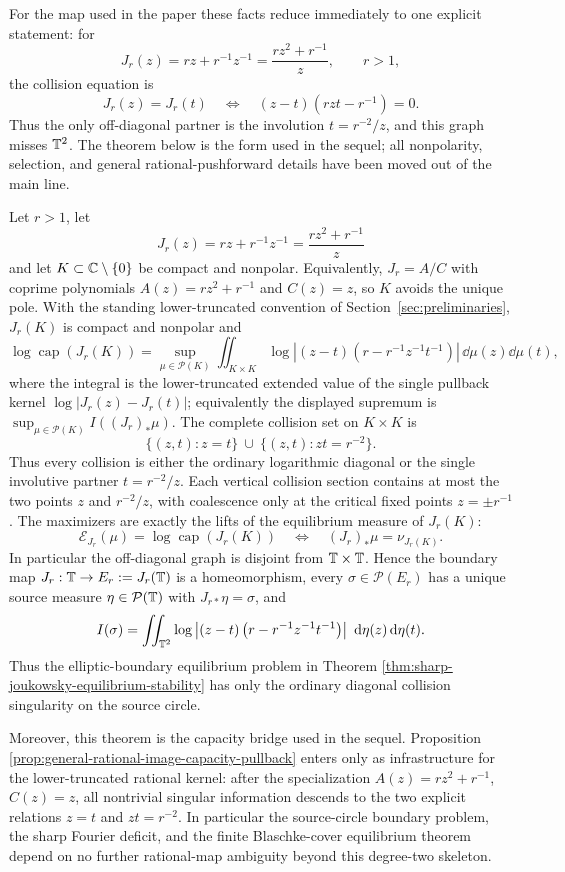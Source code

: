 For the map used in the paper these facts reduce immediately to one
explicit statement: for
\[
J_r(z)=rz+r^{-1}z^{-1}=\frac{rz^2+r^{-1}}{z},\qquad r>1,
\]
the collision equation is
\[
J_r(z)=J_r(t)\quad\Longleftrightarrow\quad (z-t)(rzt-r^{-1})=0.
\]
Thus the only off-diagonal partner is the involution
\(t=r^{-2}/z\), and this graph misses \(\mathbb{T}^2\).  The theorem below is
the form used in the sequel; all nonpolarity, selection, and general
rational-pushforward details have been moved out of the main line.
\begin{theorem}\label{thm:degree-two-joukowsky-capacity-collision-relation}
Let \(r>1\), let
\[
J_r(z)=rz+r^{-1}z^{-1}=\frac{rz^2+r^{-1}}{z}
\]
  and let \(K\subset\mathbb{C}\setminus\{0\}\) be compact and nonpolar.  Equivalently, \(J_r=A/C\) with coprime polynomials \(A(z)=rz^2+r^{-1}\) and \(C(z)=z\), so \(K\) avoids the unique pole.  With the standing lower-truncated convention of Section~\ref{sec:preliminaries}, \(J_r(K)\) is compact and nonpolar and
\[
\log\operatorname{cap}(J_r(K))
=\sup_{\mu\in\mathcal P(K)}\iint_{K\times K}\log\left|(z-t)\left(r-r^{-1}z^{-1}t^{-1}\right)\right|\,
\dd\mu(z)\dd\mu(t),
\]
where the integral is the lower-truncated extended value of the single pullback kernel \(\log|J_r(z)-J_r(t)|\); equivalently the displayed supremum is \(\sup_{\mu\in\mathcal P(K)}I((J_r)_\ast\mu)\).  The complete collision set on \(K\times K\) is
\[
\{(z,t):z=t\}\ \cup\ \{(z,t):zt=r^{-2}\}.
\]
Thus every collision is either the ordinary logarithmic diagonal or the single involutive partner \(t=r^{-2}/z\).  Each vertical collision section contains at most the two points \(z\) and \(r^{-2}/z\), with coalescence only at the critical fixed points \(z=\pm r^{-1}\).  The maximizers are exactly the lifts of the equilibrium measure of \(J_r(K)\):
\[
\mathcal E_{J_r}(\mu)=\log\operatorname{cap}(J_r(K))
\quad\Longleftrightarrow\quad
(J_r)_\ast\mu=\nu_{J_r(K)}.
\]
In particular the off-diagonal graph is disjoint from \(\mathbb{T}\times\mathbb{T}\).  Hence the boundary map \(J_r:\mathbb{T}\to E_r:=J_r(\mathbb{T})\) is a homeomorphism, every \(\sigma\in\mathcal P(E_r)\) has a unique source measure \(\eta\in\mathcal P(\mathbb{T})\) with \(J_{r\ast}\eta=\sigma\), and
\[
I(\sigma)=
\iint_{\mathbb{T}^2}
\log\left|(z-t)\left(r-r^{-1}z^{-1}t^{-1}\right)\right|
\,\,\mathrm{d}\eta(z)\,\mathrm{d}\eta(t).
\]
Thus the elliptic-boundary equilibrium problem in Theorem \ref{thm:sharp-joukowsky-equilibrium-stability} has only the ordinary diagonal collision singularity on the source circle.

Moreover, this theorem is the capacity bridge used in the sequel.  Proposition \ref{prop:general-rational-image-capacity-pullback} enters only as infrastructure for the lower-truncated rational kernel: after the specialization \(A(z)=rz^2+r^{-1}\), \(C(z)=z\), all nontrivial singular information descends to the two explicit relations \(z=t\) and \(zt=r^{-2}\).  In particular the source-circle boundary problem, the sharp Fourier deficit, and the finite Blaschke-cover equilibrium theorem depend on no further rational-map ambiguity beyond this degree-two skeleton.
\end{theorem}

